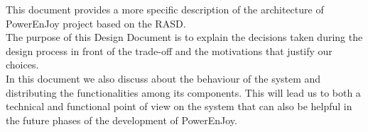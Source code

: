 
This document provides a more specific description of the architecture of PowerEnJoy project based on the RASD.
\\The purpose of this Design Document is to explain the decisions taken during the design process in front of the trade-off and the motivations that justify our choices.
\\ In this document we also discuss about the behaviour of the system and distributing the functionalities among its components. This will lead us to both a technical and functional point of view on the system that can also be helpful in the future phases of the development of PowerEnJoy.


